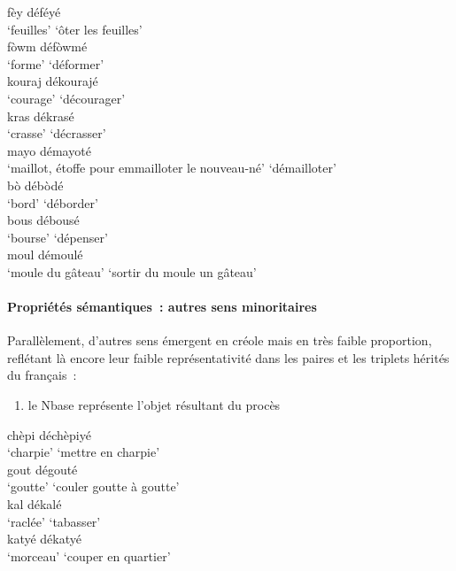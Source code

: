 \documentclass[output=paper]{langsci/langscibook}
\begin{document}
\ea \label{ex:VilloingDeglas:47}
      \ea \gll fèy \textrightarrow{} déféyé\\
        {`feuilles'} {} {`ôter les feuilles'}\\
      \ex \gll  fòwm \textrightarrow{} défòwmé\\
        {`forme'} {} {`déformer'}\\
      \ex \gll  kouraj \textrightarrow{} dékourajé\\
        {`courage'} {} {`décourager'}\\
      \ex \gll  kras \textrightarrow{} dékrasé\\
        {`crasse'} {} {`décrasser'}\\
      \ex \gll  mayo \textrightarrow{} démayoté\\
        {`maillot, étoffe pour emmailloter le nouveau-né'} {} {`démailloter'}\\
      \z
\ex \label{ex:VilloingDeglas:48}
      \ea \gll bò \textrightarrow{} débòdé\\
        {`bord'} {} {`déborder'}\\
      \ex \gll  bous \textrightarrow{} débousé\\
        {`bourse'} {} {`dépenser'}\\
      \ex \gll  moul \textrightarrow{} démoulé\\
        {`moule du gâteau'} {} {`sortir du moule un gâteau'}\\
\z\z

\paragraph{Propriétés sémantiques~: autres sens
minoritaires}\label{propriétés-sémantiques-autres-sens-minoritaires}

Parallèlement, d'autres sens émergent en créole mais en très faible
proportion, reflétant là encore leur faible représentativité dans les
paires et les triplets hérités du français~:

\begin{enumerate}\def\labelenumi{(\roman{enumi})}
\item
  le Nbase représente l'objet résultant du procès
\end{enumerate}


\ea \label{ex:VilloingDeglas:49}
      \ea \gll chèpi \textrightarrow{} déchèpiyé\\
        {`charpie'} {} {`mettre en charpie'}\\
      \ex \gll  gout \textrightarrow{} dégouté\\
        {`goutte'} {} {`couler goutte à goutte'}\\
      \ex \gll  kal \textrightarrow{} dékalé\\
        {`raclée'} {} {`tabasser'}\\
      \ex \gll  katyé \textrightarrow{} dékatyé\\
        {`morceau'} {} {`couper en quartier'}\\
\z\z
\end{document}

